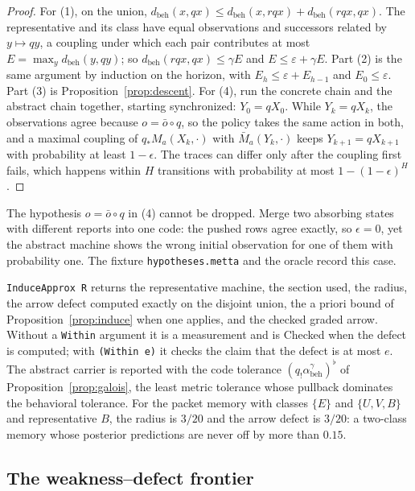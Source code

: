 \documentclass[11pt]{article}
\newcommand{\code}[1]{\texttt{#1}}
\newcommand{\abeh}{\alpha_{\mathrm{beh}}}
\newcommand{\dbeh}{d_{\mathrm{beh}}}
\theoremstyle{definition}
\theoremstyle{plain}
\begin{document}
\begin{proof}
For (1), on the union, $\dbeh(x,qx)\le\dbeh(x,rqx)+\dbeh(rqx,qx)$. The representative and its
class have equal observations and successors related by $y\mapsto qy$, a coupling under which each
pair contributes at most $E=\max_y\dbeh(y,qy)$; so $\dbeh(rqx,qx)\le\gamma E$ and
$E\le\varepsilon+\gamma E$. Part (2) is the same argument by induction on the horizon, with
$E_h\le\varepsilon+E_{h-1}$ and $E_0\le\varepsilon$. Part (3) is Proposition~\ref{prop:descent}.
For (4), run the concrete chain and the abstract chain together, starting synchronized:
$Y_0=qX_0$. While $Y_k=qX_k$, the observations agree because $o=\bar o\circ q$, so the policy takes
the same action in both, and a maximal coupling of $q_*M_a(X_k,\cdot)$ with $\bar M_a(Y_k,\cdot)$
keeps $Y_{k+1}=qX_{k+1}$ with probability at least $1-\epsilon$. The traces can differ only after
the coupling first fails, which happens within $H$ transitions with probability at most
$1-(1-\epsilon)^H$.
\end{proof}

The hypothesis $o=\bar o\circ q$ in (4) cannot be dropped. Merge two absorbing states with
different reports into one code: the pushed rows agree exactly, so $\epsilon=0$, yet the abstract
machine shows the wrong initial observation for one of them with probability one. The fixture
\code{hypotheses.metta} and the oracle record this case.

\code{InduceApprox R} returns the representative machine, the section used, the radius, the arrow
defect computed exactly on the disjoint union, the a priori bound of
Proposition~\ref{prop:induce} when one applies, and the checked graded arrow. Without a
\code{Within} argument it is a measurement and is Checked when the defect is computed; with
\code{(Within e)} it checks the claim that the defect is at most $e$. The abstract carrier is
reported with the code tolerance $(q_!\abeh^\gamma)^\flat$ of Proposition~\ref{prop:galois}, the
least metric tolerance whose pullback dominates the behavioral tolerance. For the packet memory
with classes $\{E\}$ and $\{U,V,B\}$ and representative $B$, the radius is $3/20$ and the arrow
defect is $3/20$: a two-class memory whose posterior predictions are never off by more than
$0.15$.

\subsection{The weakness--defect frontier}\label{sec:frontier}
\end{document}
